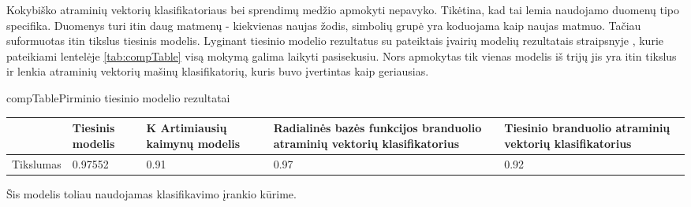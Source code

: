 
Kokybiško atraminių vektorių klasifikatoriaus bei sprendimų medžio apmokyti nepavyko.
Tikėtina, kad tai lemia naudojamo duomenų tipo specifika. Duomenys turi itin daug
matmenų - kiekvienas naujas žodis, simbolių grupė yra koduojama kaip naujas matmuo.
Tačiau suformuotas itin tikslus tiesinis modelis. Lyginant tiesinio modelio rezultatus
su pateiktais įvairių modelių rezultatais straipsnyje \cite{comp}, kurie pateikiami
lentelėje \vref{tab:compTable} visą mokymą galima laikyti pasisekusiu. Nors apmokytas
tik vienas modelis iš trijų jis yra itin tikslus ir lenkia atraminių vektorių mašinų klasifikatorių, kuris buvo įvertintas kaip geriausias.

\begin{ktutable}{compTable}{Pirminio tiesinio modelio rezultatai}
    \begin{tabular}{|l|p{3cm}|p{3cm}|p{3cm}|p{3cm}|}
    \hline
                             & Tiesinis modelis  &  K Artimiausių kaimynų modelis  &  Radialinės bazės funkcijos branduolio atraminių vektorių klasifikatorius  &  Tiesinio branduolio atraminių vektorių klasifikatorius \\ \hline
               Tikslumas     & 0.97552           & 0.91   & 0.97  &  0.92         \\ \hline
    \end{tabular}
\end{ktutable}

Šis modelis toliau naudojamas klasifikavimo įrankio kūrime.

